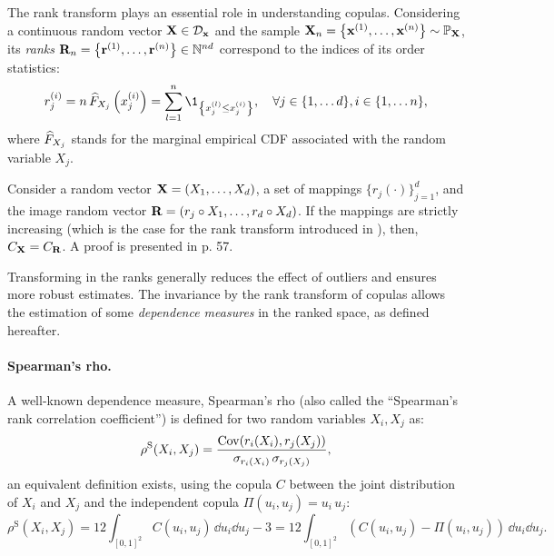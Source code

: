 The rank transform plays an essential role in understanding copulas. 
Considering a continuous random vector ${\bf X} \in \mathcal{D}_{{\bf x}}$ and the sample ${\bf X}_n = \left\{{\bf x}^{(1)}, \dots, {\bf x}^{(n)}\right\} \sim \mathbb{P}_{{\bf X}}$, its \textit{ranks} ${\bf R}_n = \left\{{\bf r}^{(1)}, \dots, {\bf r}^{(n)}\right\} \in \mathbb{N}^{n d}$ correspond to the indices of its order statistics: 
\begin{equation}
    r^{(i)}_j = n \, \what{F}_{X_j}\left(x_j^{(i)}\right) = \sum_{l=1}^n \1_{\left\{x^{(l)}_j \leq x^{(i)}_j\right\}}, \quad \forall j \in \{1, \dots d\}, i \in \{1, \dots n\},
    \label{eq:ranks}  
\end{equation}
where $\widehat{F}_{X_j}$ stands for the marginal empirical CDF associated with the random variable $X_j$.


\begin{theorem}
    Consider a random vector ${\bf X}=(X_1, \dots, X_d)$, a set of mappings $\{r_j (\cdot)\}_{j=1}^d$, and the image random vector ${\bf R}=(r_j \circ X_1, \dots, r_d \circ X_d)$. 
    If the mappings are strictly increasing (which is the case for the rank transform introduced in ), then, $C_{\bf X} = C_{\bf R}$. 
    A proof is presented in \citet{durante_2015_copula} p. 57.
\end{theorem}

Transforming in the ranks generally reduces the effect of outliers and ensures more robust estimates. 
The invariance by the rank transform of copulas allows the estimation of some \textit{dependence measures} in the ranked space, as defined hereafter. 


\paragraph{Spearman's rho.} 
A well-known dependence measure, Spearman's rho (also called the ``Spearman's rank correlation coefficient'') is defined for two random variables $X_i, X_j$ as: 
\begin{equation}
    \rho^{\mathrm{S}}(X_i, X_j) = \frac{\operatorname{Cov}(r_i(X_i), r_j(X_j))}{\sigma_{r_i(X_i)} \, \sigma_{r_j(X_j)}},
\end{equation}
an equivalent definition exists, using the copula $C$ between the joint distribution of $X_i$ and $X_j$ and the independent copula $\Pi(u_i, u_j) = u_i \, u_j$: 
\begin{equation}
    \rho^{\mathrm{S}}(X_i, X_j) = 12 \int_{[0, 1]^2} C(u_i, u_j) \, \dd u_i \dd u_j - 3 = 12 \int_{[0, 1]^2} (C(u_i, u_j) - \Pi(u_i, u_j)) \, \dd u_i \dd u_j. 
\end{equation}

